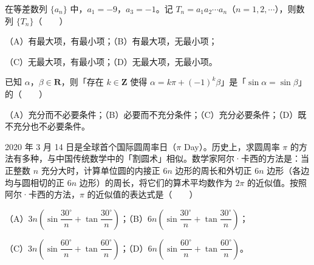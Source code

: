 \begin{question}
在等差数列 $\{a_n\}$ 中，$a_1=-9$，$a_3=-1$。记 $T_n=a_1a_2\cdots a_n$（$n=1,2,\cdots$），则数列 $\{T_n\}$\mbox{（　　）}

（A）有最大项，有最小项；（B）有最大项，无最小项；

（C）无最大项，有最小项；（D）无最大项，无最小项。

\end{question}
\begin{question}
已知 $\alpha$，$\beta\in\mathbf R$，则「存在 $k\in\mathbf Z$ 使得 $\alpha=k\pi+(-1)^k\beta$」是「$\sin\alpha=\sin\beta$」的\mbox{（　　）}

（A）充分而不必要条件；（B）必要而不充分条件；（C）充分必要条件；（D）既不充分也不必要条件。

\end{question}
\begin{question}
2020 年 3 月 14 日是全球首个国际圆周率日（$\pi$ Day）。历史上，求圆周率 $\pi$ 的方法有多种，与中国传统数学中的「割圆术」相似。数学家阿尔·卡西的方法是：当正整数 $n$ 充分大时，计算单位圆的内接正 $6n$ 边形的周长和外切正 $6n$ 边形（各边均与圆相切的正 $6n$ 边形）的周长，将它们的算术平均数作为 $2\pi$ 的近似值。按照阿尔·卡西的方法，$\pi$ 的近似值的表达式是\mbox{（　　）}

（A）$3n\left(\sin\dfrac{30^\circ}{n}+\tan\dfrac{30^\circ}{n}\right)$；（B）$6n\left(\sin\dfrac{30^\circ}{n}+\tan\dfrac{30^\circ}{n}\right)$；

（C）$3n\left(\sin\dfrac{60^\circ}{n}+\tan\dfrac{60^\circ}{n}\right)$；（D）$6n\left(\sin\dfrac{60^\circ}{n}+\tan\dfrac{60^\circ}{n}\right)$。

\end{question}

